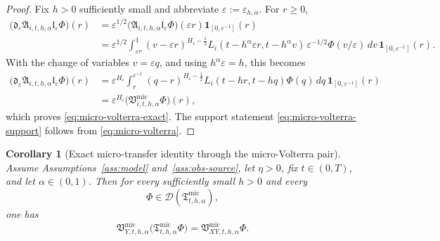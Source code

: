 \documentclass[11pt,a4paper]{amsart}
\theoremstyle{plain}
\newtheorem{corollary}[theorem]{Corollary}
\theoremstyle{definition}
\theoremstyle{remark}
\newcommand{\one}{\mathbf 1}
\begin{document}
\begin{proof}
Fix \(h>0\) sufficiently small and abbreviate \(\varepsilon:=\varepsilon_{h,\alpha}\). For \(r\ge0\),
\begin{align*}
\bigl(
\mathfrak d_{\varepsilon}\mathfrak A_{i,t,h,\alpha}\mathfrak l_{\varepsilon}\Phi
\bigr)(r)
&=
\varepsilon^{1/2}
\bigl(
\mathfrak A_{i,t,h,\alpha}\mathfrak l_{\varepsilon}\Phi
\bigr)(\varepsilon r)
\one_{[0,\varepsilon^{-1}]}(r) \\
&=
\varepsilon^{1/2}
\int_{\varepsilon r}^1
(v-\varepsilon r)^{H_i-\frac12}
L_i(t-h^\alpha\varepsilon r,t-h^\alpha v)\,
\varepsilon^{-1/2}\Phi(v/\varepsilon)\,dv\,
\one_{[0,\varepsilon^{-1}]}(r).
\end{align*}
With the change of variables \(v=\varepsilon q\), and using \(h^\alpha\varepsilon=h\), this becomes
\begin{align*}
\bigl(
\mathfrak d_{\varepsilon}\mathfrak A_{i,t,h,\alpha}\mathfrak l_{\varepsilon}\Phi
\bigr)(r)
&=
\varepsilon^{H_i}
\int_r^{\varepsilon^{-1}}
(q-r)^{H_i-\frac12}
L_i(t-hr,t-hq)\Phi(q)\,dq\,
\one_{[0,\varepsilon^{-1}]}(r) \\
&=
\varepsilon^{H_i}
\bigl(\mathfrak V_{i,t,h,\alpha}^{\mathrm{mic}}\Phi\bigr)(r),
\end{align*}
which proves \eqref{eq:micro-volterra-exact}. The support statement
\eqref{eq:micro-volterra-support} follows from \eqref{eq:micro-volterra}.
\end{proof}

\begin{corollary}[Exact micro-transfer identity through the micro-Volterra pair]
\label{cor:micro-volterra-transfer}
Assume Assumptions~\ref{ass:model} and~\ref{ass:obs-source}, let \(\eta>0\), fix \(t\in(0,T)\),
and let \(\alpha\in(0,1)\). Then for every sufficiently small \(h>0\) and every
\[
\Phi\in\mathcal D(\mathfrak T_{t,h,\alpha}^{\mathrm{mic}}),
\]
one has
\begin{equation}\label{eq:micro-volterra-transfer}
\mathfrak V_{Y,t,h,\alpha}^{\mathrm{mic}}
\bigl(
\mathfrak T_{t,h,\alpha}^{\mathrm{mic}}\Phi
\bigr)
=
\mathfrak V_{XY,t,h,\alpha}^{\mathrm{mic}}\Phi.
\end{equation}
\end{corollary}
\end{document}
